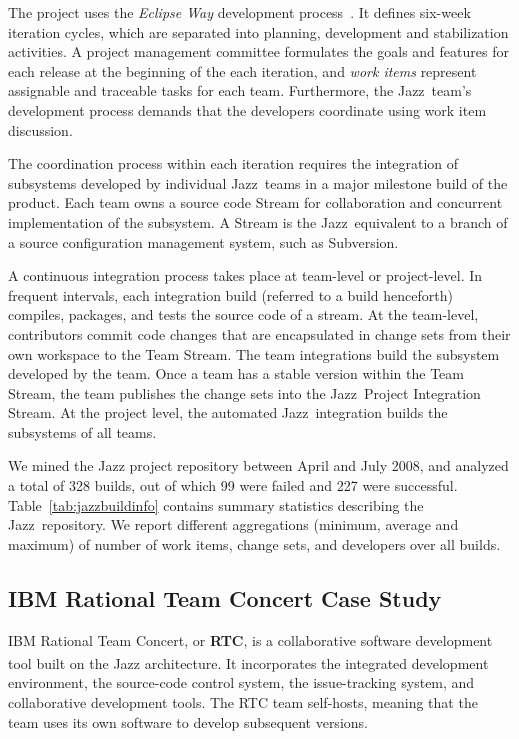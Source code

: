 The project uses the \emph{Eclipse Way} development process~\cite{frost:ieeesoftware:2007}.
It defines six-week iteration cycles, which are separated into planning,
development and stabilization activities. A project management committee
formulates the goals and features for each release at the beginning of the each
iteration, and \emph{work items} represent assignable and traceable tasks for each
team.
Furthermore, the Jazz\texttrademark\ team's development process demands that the developers coordinate using work item discussion. 

The coordination process within
each iteration requires the integration of subsystems developed by individual
Jazz\tm\ teams in a major milestone build of the product.
Each team owns a source code Stream for collaboration and concurrent
implementation of the subsystem. A Stream is the Jazz\tm\ equivalent to a branch of a
source configuration management system, such as Subversion.

A continuous integration process takes place at team-level or project-level. In
frequent intervals, each integration build (referred to a build henceforth)
compiles, packages, and tests the source code of a stream. At the team-level,
contributors commit code changes that are encapsulated in change sets from
their own workspace to the Team Stream. The team integrations build the
subsystem developed by the team. Once a team has a stable version within the Team
Stream, the team publishes the change sets into the Jazz\tm\ Project Integration
Stream. At the project level, the automated
Jazz\tm\ integration builds the subsystems of all teams. 


We mined the Jazz project repository between April and July 2008, and analyzed a
total of 328 builds, out of which 99 were failed and 227 were successful.
Table~\ref{tab:jazzbuildinfo} contains summary statistics describing the Jazz\tm\
repository. We report different aggregations (minimum, average and maximum) of
number of work items, change sets, and developers over all builds. 










\subsection{IBM Rational Team Concert Case Study}
IBM Rational Team Concert, or \textbf{RTC}, is a collaborative software development tool built on the Jazz\textsuperscript{\texttrademark} architecture. It incorporates the integrated development environment, the source-code control system, the issue-tracking system, and collaborative development tools. The RTC team self-hosts, meaning that the team uses its own software to develop subsequent versions.

